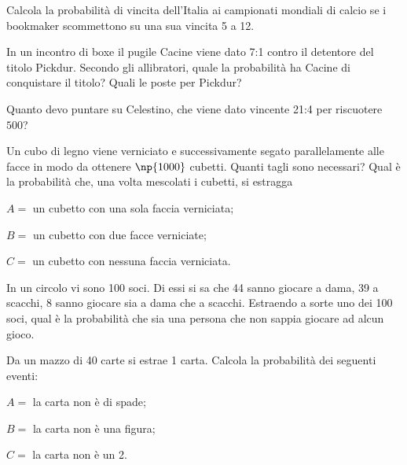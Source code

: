 \begin{esercizio}[\Ast]
 \label{ese:9.40}
Calcola la probabilità di vincita dell'Italia ai campionati mondiali di calcio se i bookmaker scommettono su una sua vincita 5 a 12.
\end{esercizio}

\begin{esercizio}[\Ast]
 \label{ese:9.41}
In un incontro di boxe il pugile Cacine viene dato 7:1 contro il detentore del titolo Pickdur.
Secondo gli allibratori, quale la probabilità ha Cacine di conquistare il titolo?
Quali le poste per Pickdur?
\end{esercizio}

\begin{esercizio}[\Ast]
 \label{ese:9.42}
Quanto devo puntare su Celestino, che viene dato vincente 21:4 per riscuotere \officialeuro~$500$?
\end{esercizio}

\begin{esercizio}[\Ast]
 \label{ese:9.43}
Un cubo di legno viene verniciato e successivamente segato parallelamente alle facce in modo da ottenere $\np{1000}$ cubetti. Quanti tagli sono necessari? Qual è la probabilità che, una volta mescolati i cubetti, si estragga
\begin{itemize*}
\item $ A= $ un cubetto con una sola faccia verniciata;
\item $ B= $ un cubetto con due facce verniciate;
\item $ C= $ un cubetto con nessuna faccia verniciata.
\end{itemize*}
\end{esercizio}

\begin{esercizio}[\Ast]
 \label{ese:9.44}
In un circolo vi sono 100 soci. Di essi si sa che 44 sanno giocare a dama, 39 a scacchi, 8 sanno giocare sia a dama che a scacchi. Estraendo a sorte uno dei 100 soci, qual è la probabilità che sia una persona che non sappia giocare ad alcun gioco.
\end{esercizio}

\begin{esercizio}[\Ast]
 \label{ese:9.45}
Da un mazzo di 40 carte si estrae 1 carta. Calcola la probabilità dei seguenti eventi:
\begin{itemize*}
\item $ A= $ la carta non è di spade;
\item $ B= $ la carta non è una figura;
\item $ C= $ la carta non è un 2.
\end{itemize*}
\end{esercizio}

